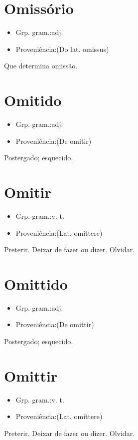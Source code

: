 \section{Omissório}
\begin{itemize}
\item {Grp. gram.:adj.}
\end{itemize}
\begin{itemize}
\item {Proveniência:(Do lat. \textunderscore omissus\textunderscore )}
\end{itemize}
Que determina omissão.
\section{Omitido}
\begin{itemize}
\item {Grp. gram.:adj.}
\end{itemize}
\begin{itemize}
\item {Proveniência:(De \textunderscore omitir\textunderscore )}
\end{itemize}
Postergado; esquecido.
\section{Omitir}
\begin{itemize}
\item {Grp. gram.:v. t.}
\end{itemize}
\begin{itemize}
\item {Proveniência:(Lat. \textunderscore omittere\textunderscore )}
\end{itemize}
Preterir.
Deixar de fazer ou dizer.
Olvidar.
\section{Omittido}
\begin{itemize}
\item {Grp. gram.:adj.}
\end{itemize}
\begin{itemize}
\item {Proveniência:(De \textunderscore omittir\textunderscore )}
\end{itemize}
Postergado; esquecido.
\section{Omittir}
\begin{itemize}
\item {Grp. gram.:v. t.}
\end{itemize}
\begin{itemize}
\item {Proveniência:(Lat. \textunderscore omittere\textunderscore )}
\end{itemize}
Preterir.
Deixar de fazer ou dizer.
Olvidar.
